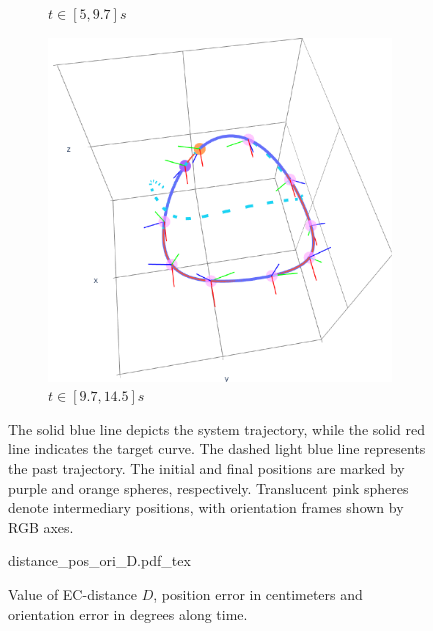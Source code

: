 \begin{figure}[ht!]
\begin{subfigure}[b]{0.32\textwidth}
        \caption{$t\in[5, 9.7]s$}
        \label{fig:vfplot-second}
    \end{subfigure}
    \hfill
    \begin{subfigure}[b]{0.32\textwidth}
        \centering
        \includegraphics[width=\textwidth]{figures/vf_automatica_3.pdf} %
        \caption{$t\in[9.7, 14.5]s$}
        \label{fig:vfplot-third}
    \end{subfigure}
    \caption{The solid blue line depicts the system trajectory, while the solid red line indicates the target curve. The dashed light blue line represents the past trajectory. The initial and final positions are marked by purple and orange spheres, respectively. Translucent pink spheres denote intermediary positions, with orientation frames shown by RGB axes.}
    \label{fig:vfplot-trajectory}
\end{figure}
\begin{figure}[ht!]
    \centering
    \def\svgwidth{.8\linewidth}
    {\tiny{distance_pos_ori_D.pdf_tex}}
    \caption{Value of EC-distance $D$, position error in centimeters and orientation error in degrees along time.}
    \label{fig:position-orientation-errors}
\end{figure}
